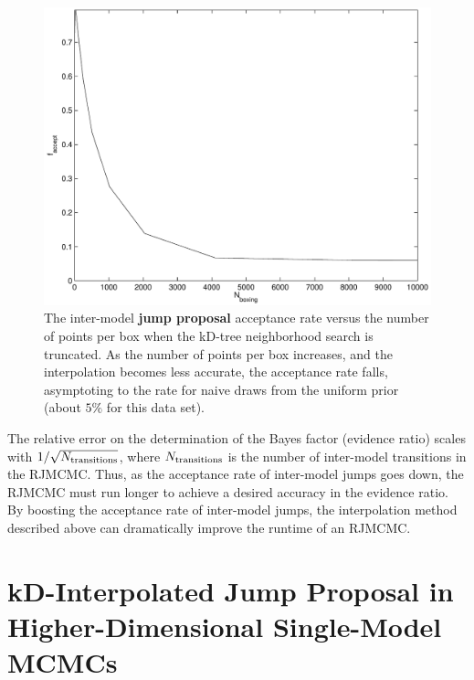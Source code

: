 \documentclass{iopart}
\newcommand{\ilya}[1]{{\color{red} \bf #1}}
\begin{document}
\begin{figure}
  \begin{center}
    \includegraphics[width=0.8\columnwidth]{Figure2_acceptRate}
  \end{center}
  \caption{\label{fig:acceptRate} The inter-model \ilya{jump proposal} acceptance rate
    versus the number of points per box when the kD-tree neighborhood
    search is truncated.  As the number of points per box increases,
    and the interpolation becomes less accurate, the acceptance rate
    falls, asymptoting to the rate for naive draws from the uniform
    prior (about $5\%$ for this data set).}
\end{figure}

The relative error on the determination of the Bayes factor (evidence ratio) scales
with $1/\sqrt{N_{\textnormal{transitions}}}$, where
$N_{\textnormal{transitions}}$ is the number of inter-model
transitions in the RJMCMC.  Thus, as the acceptance rate of
inter-model jumps goes down, the RJMCMC must run longer to achieve a
desired accuracy in the evidence ratio.  By boosting the acceptance
rate of inter-model jumps, the interpolation method described above
can dramatically improve the runtime of an RJMCMC.

\section{kD-Interpolated Jump Proposal in Higher-Dimensional
  Single-Model MCMCs}
\label{sec:higherdim}
\end{document}
